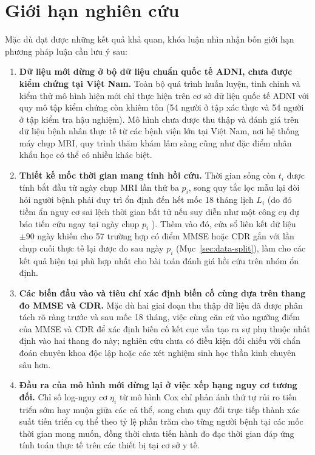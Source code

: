 \section{Giới hạn nghiên cứu}
\label{sec:study-limitations}
Mặc dù đạt được những kết quả khả quan, khóa luận nhìn nhận bốn giới hạn phương pháp luận cần lưu ý sau:
\begin{enumerate}[itemsep=0.15em,topsep=0.25em]
\item \textbf{Dữ liệu mới dừng ở bộ dữ liệu chuẩn quốc tế ADNI, chưa được kiểm chứng tại Việt Nam.} Toàn bộ quá trình huấn luyện, tinh chỉnh và kiểm thử mô hình hiện mới chỉ thực hiện trên cơ sở dữ liệu quốc tế ADNI với quy mô tập kiểm chứng còn khiêm tốn (54 người ở tập xác thực và 54 người ở tập kiểm tra hậu nghiệm). Mô hình chưa được thu thập và đánh giá trên dữ liệu bệnh nhân thực tế từ các bệnh viện lớn tại Việt Nam, nơi hệ thống máy chụp MRI, quy trình thăm khám lâm sàng cũng như đặc điểm nhân khẩu học có thể có nhiều khác biệt.
\item \textbf{Thiết kế mốc thời gian mang tính hồi cứu.} Thời gian sống còn $t_i$ được tính bắt đầu từ ngày chụp MRI lần thứ ba $p_i$, song quy tắc lọc mẫu lại đòi hỏi người bệnh phải duy trì ổn định đến hết mốc 18 tháng lịch $L_i$ (do đó tiềm ẩn nguy cơ sai lệch thời gian bất tử nếu suy diễn như một công cụ dự báo tiến cứu ngay tại ngày chụp $p_i$ \cite{suissa2008immortal}). Thêm vào đó, cửa sổ liên kết dữ liệu $\pm90$ ngày khiến cho 57 trường hợp có điểm MMSE hoặc CDR gắn với lần chụp cuối thực tế lại được đo sau ngày $p_i$ (Mục~\ref{sec:data-split}), làm cho các kết quả hiện tại phù hợp nhất cho bài toán đánh giá hồi cứu trên nhóm ổn định.
\item \textbf{Các biến đầu vào và tiêu chí xác định biến cố cùng dựa trên thang đo MMSE và CDR.} Mặc dù hai giai đoạn thu thập dữ liệu đã được phân tách rõ ràng trước và sau mốc 18 tháng, việc cùng căn cứ vào ngưỡng điểm của MMSE và CDR để xác định biến cố kết cục vẫn tạo ra sự phụ thuộc nhất định vào hai thang đo này; nghiên cứu chưa có điều kiện đối chiếu với chẩn đoán chuyên khoa độc lập hoặc các xét nghiệm sinh học thần kinh chuyên sâu hơn.
\item \textbf{Đầu ra của mô hình mới dừng lại ở việc xếp hạng nguy cơ tương đối.} Chỉ số log-nguy cơ $\eta_i$ từ mô hình Cox chỉ phản ánh thứ tự rủi ro tiến triển sớm hay muộn giữa các cá thể, song chưa quy đổi trực tiếp thành xác suất tiến triển cụ thể theo tỷ lệ phần trăm cho từng người bệnh tại các mốc thời gian mong muốn, đồng thời chưa tiến hành đo đạc thời gian đáp ứng tính toán thực tế trên các thiết bị tại cơ sở y tế.
\end{enumerate}

